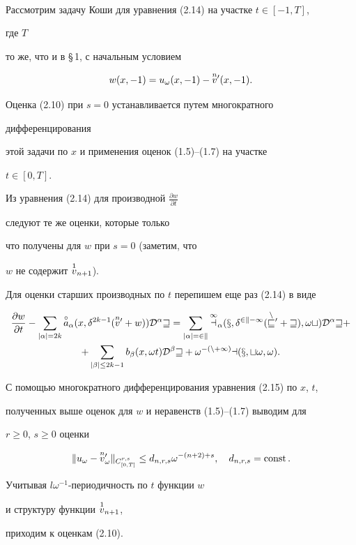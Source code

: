 \begin{pf}
\begin{multline*}
\end{multline*} 


 


Рассмотрим задачу Коши для уравнения (2.14) на участке $t\in[-1,T]$, 


где $T$ 


то же, что и в \S\,1, с начальным условием 


$$ 


w(x,-1)=u_\omega(x,-1)-\up{n}{v}'(x,-1). 


$$ 


Оценка (2.10) при $s=0$ устанавливается путем многократного 


дифференцирования 


этой задачи по $x$ и применения оценок (1.5)--(1.7) на участке 


$t\in[0,T]$. 


 


Из уравнения (2.14) для производной $\frac{\partial w}{\partial t}$ 


следуют те же оценки, которые только 


что получены для $w$ при $s=0$ (заметим, что 


$w$ не содержит $\overset{1}{v}{}_{n+1}$). 


Для оценки старших производных по $t$ перепишем еще раз (2.14) в виде 


\begin{multline} 


\frac{\partial w}{\partial t}-\sum_{|\alpha|=2k} 


\up{\circ}{a}_\alpha(x,\delta^{2k-1}(\up{n}{v}'+w)) 


\cal D^\alpha w=\sum_{|\alpha|=2k}\up{1}{a}_\alpha 


(x,\delta^{2k-1}(\up{n}{v}'+w),\omega t)\cal D^\alpha w+ \\ 


% 


+\sum_{|\beta|\le 2k-1}b_\beta(x,\omega t)\cal D^\beta w+ 


\omega^{-(n+1)}a(x,t\omega,\omega). 


\end{multline} 


С помощью многократного дифференцирования уравнения (2.15) по $x$, $t$, 


полученных выше оценок для $w$ и неравенств (1.5)--(1.7) выводим для 


$r\ge0$, $s\ge0$ оценки 


$$ 


\|u_\omega-\up{n}{v}'_\omega\|_{C^{r,s}_{[0,T]}}\le 


d_{n,r,s}\omega^{-(n+2)+s},\quad 


d_{n,r,s}=\const. 


$$ 


Учитывая $l\omega^{-1}$-периодичность по $t$ функции $w$ 


и структуру функции $\overset{1}{v}{}_{n+1}$, 


приходим к оценкам (2.10).


\end{pf}


